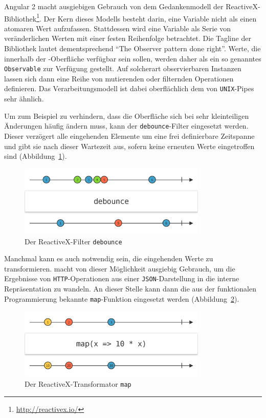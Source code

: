 Angular 2 macht ausgiebigen Gebrauch von dem Gedankenmodell der ReactiveX-Bib\-liothek\footnote{\url{http://reactivex.io/}}. Der Kern dieses Modells besteht darin, eine Variable nicht als einen atomaren Wert aufzufassen. Stattdessen wird eine Variable als Serie von veränderlichen Werten mit einer festen Reihenfolge betrachtet. Die Tagline der Bibliothek lautet dementsprechend "`The Observer pattern done right"'. Werte, die innerhalb der \idename{}-Oberfläche verfügbar sein sollen, werden daher als ein so genanntes \texttt{Observable} zur Verfügung gestellt. Auf solcherart observierbaren Instanzen lassen sich dann eine Reihe von mutierenden oder filternden Operationen definieren. Das Verarbeitungsmodell ist dabei oberflächlich dem von \texttt{UNIX}-Pipes sehr ähnlich.

Um zum Beispiel zu verhindern, dass die Oberfläche sich bei sehr kleinteiligen Änderungen häufig ändern muss, kann der \texttt{debounce}-Filter eingesetzt werden. Dieser verzögert alle eingehenden Elemente um eine frei definierbare Zeitspanne und gibt sie nach dieser Wartezeit aus, sofern keine erneuten Werte eingetroffen sind (Abbildung~\ref{fig:reactivex-debounce}). 

\begin{figure}[h]
  \centering \includegraphics[width=0.8\textwidth]{images/reactivex-debounce}
  \caption{Der ReactiveX-Filter \texttt{debounce}}
  \label{fig:reactivex-debounce}
\end{figure}

Manchmal kann es auch notwendig sein, die eingehenden Werte zu transformieren. \idename{} macht von dieser Möglichkeit ausgiebig Gebrauch, um die Ergebnisse von \texttt{HTTP}-Operationen aus einer \texttt{JSON}-Darstellung in die interne Repräsentation zu wandeln. An dieser Stelle kann dann die aus der funktionalen Programmierung bekannte \texttt{map}-Funktion eingesetzt werden (Abbildung~\ref{fig:reactivex-map}).

\begin{figure}[h]
  \centering \includegraphics[width=0.8\textwidth]{images/reactivex-map}
  \caption{Der ReactiveX-Transformator \texttt{map}}
  \label{fig:reactivex-map}
\end{figure}

